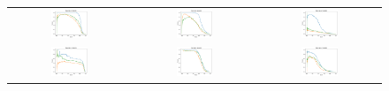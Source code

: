\begin{figure}[h!]
\begin{center}
\begin{tabular}{ccc}
\includegraphics[width=0.32\textwidth]{Kap3/test_results_train=b234Test=b261.png} &
\includegraphics[width=0.32\textwidth]{Kap3/test_results_train=b234Test=b278.png} &
\includegraphics[width=0.32\textwidth]{Kap3/test_results_train=b234Test=b360.png} \\

\includegraphics[width=0.32\textwidth]{Kap3/test_results_train=b261Test=b234.png} &
\includegraphics[width=0.32\textwidth]{Kap3/test_results_train=b261Test=b278.png} &
\includegraphics[width=0.32\textwidth]{Kap3/test_results_train=b261Test=b360.png} \\


\end{tabular}
\end{center}
\end{figure}
